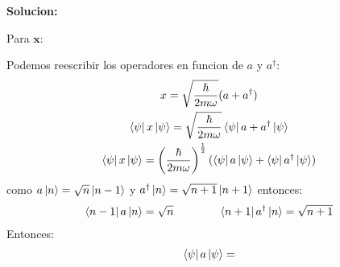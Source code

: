 \documentclass{article}
\begin{document}
\textbf{Solucion: }

Para $ \mathbf{x } $: 

Podemos reescribir los operadores en funcion de $ a  $ y $ a ^ {\dagger } $: 
\begin{gather*}
  x = \sqrt{\frac{\hbar }{2m\omega}} (a + a ^ {\dagger })\\
  \bra{\psi} x \ket{\psi} = \sqrt{\frac{\hbar }{2m \omega}} \bra{\psi}a + a ^ {\dagger }\ket{\psi}\\
  \bra{\psi}x \ket{\psi} = \left(\frac{\hbar }{2m \omega}\right)^ {\frac{1}{2}} (\bra{\psi}a \ket{\psi} + \bra{\psi}a ^ {\dagger }\ket{\psi}  )
\end{gather*}
como $ a \ket{n }  = \sqrt{n } \ket{n-1 }$  y $ a ^ {\dagger }\ket{n } = \sqrt{n + 1 } \ket{n + 1 } $ entonces: 
\begin{gather*}
  \bra{n - 1 }a \ket{n } = \sqrt{n } \qquad \qquad 
  \bra{n + 1 }a ^ {\dagger }\ket{n } = \sqrt{n + 1 }  
\end{gather*}
Entonces: 
\begin{gather*}
  \bra{\psi}a \ket{\psi} =   
\end{gather*}
\end{document}
